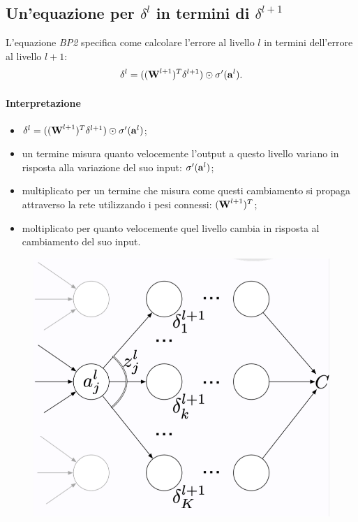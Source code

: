 \subsection{Un'equazione per $\delta^l$ in termini di $\delta^{l+1}$}
L'equazione \textit{BP2} specifica come calcolare l'errore al livello $l$ in termini dell'errore al livello $l+1$:
\begin{equation}
    \delta^l=((\text{\textbf{W}}^{l+1})^T\delta^{l+1})\odot\sigma'(\text{\textbf{a}}^l).
\end{equation}
\paragraph{Interpretazione}
\begin{itemize}
    \item $ \delta^l=((\text{\textbf{W}}^{l+1})^T\delta^{l+1})\odot\sigma'(\text{\textbf{a}}^l)$;
    \item un termine misura quanto velocemente l'output a questo livello variano in risposta alla variazione del suo input: $\sigma'(\text{\textbf{a}}^l)$;
    \item multiplicato per un termine che misura come questi cambiamento si propaga attraverso la rete utilizzando i pesi connessi: $(\text{\textbf{W}}^{l+1})^T$;
    \item moltiplicato per quanto velocemente quel livello cambia in risposta al cambiamento del suo input.
\end{itemize}
\begin{figure}[!h]
    \includegraphics[scale=.4]{images/backpropagation/secondEq.png}
    \centering
\end{figure}

